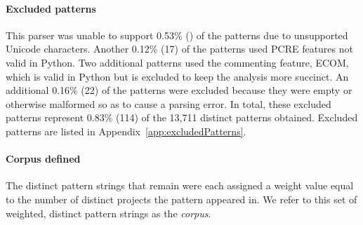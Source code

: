 \paragraph{Excluded patterns} This parser was unable to support 0.53\% () of the patterns due to unsupported Unicode characters.
Another 0.12\% (17) of the patterns used PCRE features not valid in Python.  Two additional patterns used the commenting feature, ECOM, which is valid in Python but is excluded to keep the analysis more succinct.  An additional 0.16\% (22) of the patterns were excluded because they were empty or otherwise malformed so as to cause a parsing error.  In total, these excluded patterns represent 0.83\% (114) of the 13,711 distinct patterns obtained.  Excluded patterns are listed in Appendix~\ref{app:excludedPatterns}.

\paragraph{Corpus defined} The  distinct pattern strings that remain were each assigned a weight value equal to the number of distinct projects the pattern appeared in.  We  refer to this set of weighted, distinct pattern strings as the \emph{corpus}.
